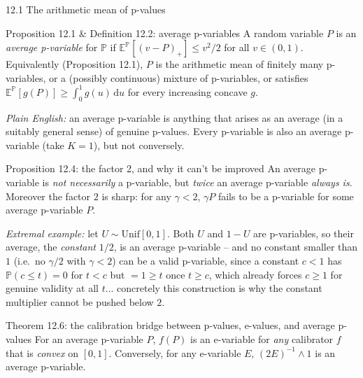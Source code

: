 \documentclass[aspectratio=169,10pt]{beamer}
\newcommand{\PP}{\mathbb{P}}
\newcommand{\EE}{\mathbb{E}}
\begin{document}
\begin{frame}[allowframebreaks]{12.1 The arithmetic mean of p-values}
  \begin{block}{Proposition 12.1 \& Definition 12.2: average p-variables}
    A random variable $P$ is an \emph{average p-variable} for $\PP$ if $\EE^\PP[(v-P)_+]\le v^2/2$ for all $v\in(0,1)$. Equivalently (Proposition 12.1), $P$ is the arithmetic mean of finitely many p-variables, or a (possibly continuous) mixture of p-variables, or satisfies $\EE^\PP[g(P)]\ge\int_0^1g(u)\,\mathrm{d}u$ for every increasing concave $g$.

    \emph{Plain English:} an average p-variable is anything that arises as an average (in a suitably general sense) of genuine p-values. Every p-variable is also an average p-variable (take $K=1$), but not conversely.
  \end{block}

  \begin{block}{Proposition 12.4: the factor 2, and why it can't be improved}
    An average p-variable is \emph{not necessarily} a p-variable, but \emph{twice} an average p-variable \emph{always is}. Moreover the factor $2$ is sharp: for any $\gamma<2$, $\gamma P$ fails to be a p-variable for some average p-variable $P$.

    \emph{Extremal example:} let $U\sim\mathrm{Unif}[0,1]$. Both $U$ and $1-U$ are p-variables, so their average, the \emph{constant} $1/2$, is an average p-variable -- and no constant smaller than $1$ (i.e.\ no $\gamma/2$ with $\gamma<2$) can be a valid p-variable, since a constant $c<1$ has $\PP(c\le t)=0$ for $t<c$ but $=1\ge t$ once $t\ge c$, which already forces $c\ge1$ for genuine validity at all $t$... concretely this construction is why the constant multiplier cannot be pushed below $2$.
  \end{block}

  \framebreak

  \begin{block}{Theorem 12.6: the calibration bridge between p-values, e-values, and average p-values}
    For an average p-variable $P$, $f(P)$ is an e-variable for \emph{any} calibrator $f$ that is \emph{convex} on $[0,1]$. Conversely, for any e-variable $E$, $(2E)^{-1}\wedge1$ is an average p-variable.
  \end{block}


\end{frame}
\end{document}
